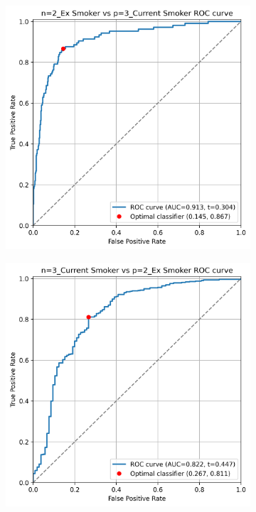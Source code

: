 \documentclass{article} %
\begin{document}
\begin{figure}[p]
    \begin{subfigure}{0.46\linewidth}
        \centering
        \includegraphics[width=\linewidth]{cohort2/test_2v3_roc.png}
    \end{subfigure}
    \hspace{4mm}
    \begin{subfigure}{0.46\linewidth}
        \centering
        \includegraphics[width=\linewidth]{cohort2/test_3v2_roc.png}
    \end{subfigure}


\end{figure}
\end{document}
